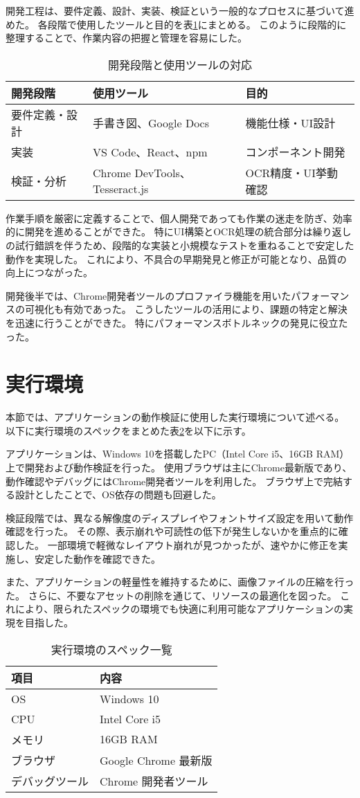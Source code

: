 \documentclass[main]{subfiles}
\begin{document}
開発工程は、要件定義、設計、実装、検証という一般的なプロセスに基づいて進めた。  
各段階で使用したツールと目的を表\ref{tab:dev_phases}にまとめる。  
このように段階的に整理することで、作業内容の把握と管理を容易にした。

\begin{table}[htbp]
\centering
\caption{開発段階と使用ツールの対応}
\label{tab:dev_phases}
\begin{tabular}{lll}
\hline
開発段階 & 使用ツール & 目的 \\
\hline
要件定義・設計 & 手書き図、Google Docs & 機能仕様・UI設計 \\
実装 & VS Code、React、npm & コンポーネント開発 \\
検証・分析 & Chrome DevTools、Tesseract.js & OCR精度・UI挙動確認 \\
\hline
\end{tabular}
\end{table}

作業手順を厳密に定義することで、個人開発であっても作業の迷走を防ぎ、効率的に開発を進めることができた。  
特にUI構築とOCR処理の統合部分は繰り返しの試行錯誤を伴うため、段階的な実装と小規模なテストを重ねることで安定した動作を実現した。  
これにより、不具合の早期発見と修正が可能となり、品質の向上につながった。

開発後半では、Chrome開発者ツールのプロファイラ機能を用いたパフォーマンスの可視化も有効であった。  
こうしたツールの活用により、課題の特定と解決を迅速に行うことができた。  
特にパフォーマンスボトルネックの発見に役立たった。
\section{実行環境}
本節では、アプリケーションの動作検証に使用した実行環境について述べる。
以下に実行環境のスペックをまとめた表\ref{tab:execution_environment}を以下に示す。

アプリケーションは、Windows 10を搭載したPC（Intel Core i5、16GB RAM）上で開発および動作検証を行った。  
使用ブラウザは主にChrome最新版であり、動作確認やデバッグにはChrome開発者ツールを利用した。  
ブラウザ上で完結する設計としたことで、OS依存の問題も回避した。

検証段階では、異なる解像度のディスプレイやフォントサイズ設定を用いて動作確認を行った。
その際、表示崩れや可読性の低下が発生しないかを重点的に確認した。
一部環境で軽微なレイアウト崩れが見つかったが、速やかに修正を実施し、安定した動作を確認できた。

また、アプリケーションの軽量性を維持するために、画像ファイルの圧縮を行った。
さらに、不要なアセットの削除を通じて、リソースの最適化を図った。
これにより、限られたスペックの環境でも快適に利用可能なアプリケーションの実現を目指した。

\begin{table}[htbp]
\centering
\caption{実行環境のスペック一覧}
\label{tab:execution_environment}
\begin{tabular}{ll}
\hline
項目 & 内容 \\
\hline
OS & Windows 10 \\
CPU & Intel Core i5 \\
メモリ & 16GB RAM \\
ブラウザ & Google Chrome 最新版 \\
デバッグツール & Chrome 開発者ツール \\
\hline
\end{tabular}
\end{table}
\end{document}
